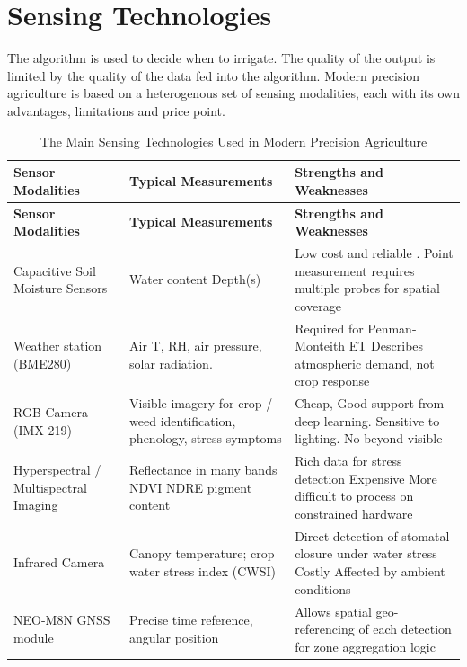 \documentclass[12pt,a4paper]{report}
\renewcommand{\arraystretch}{1.25}
\begin{document}
\section{Sensing Technologies}

The algorithm is used to decide when to irrigate. The quality of the output is limited by the quality of the data fed into the algorithm. Modern precision agriculture is based on a heterogenous set of sensing modalities, each with its own advantages, limitations and price point.

\begingroup
\small
\setlength{\parskip}{0pt}
\setlength{\tabcolsep}{4pt}
\renewcommand{\arraystretch}{1.2}
\begin{longtable}{|P{0.24\textwidth}|P{0.30\textwidth}|P{0.34\textwidth}|}
\caption{The Main Sensing Technologies Used in Modern Precision Agriculture}\\
\hline
\textbf{Sensor Modalities} & \textbf{Typical Measurements} & \textbf{Strengths and Weaknesses} \\ \hline
\endfirsthead
\hline
\textbf{Sensor Modalities} & \textbf{Typical Measurements} & \textbf{Strengths and Weaknesses} \\ \hline
\endhead
Capacitive Soil Moisture Sensors & Water content Depth(s) & Low cost and reliable . Point measurement requires multiple probes for spatial coverage \\ \hline
Weather station (BME280) & Air T, RH, air pressure, solar radiation. & Required for Penman-Monteith ET Describes atmospheric demand, not crop response \\ \hline
RGB Camera (IMX 219) & Visible imagery for crop / weed identification, phenology, stress symptoms & Cheap, Good support from deep learning. Sensitive to lighting. No beyond visible \\ \hline
Hyperspectral / Multispectral Imaging & Reflectance in many bands NDVI NDRE pigment content & Rich data for stress detection Expensive More difficult to process on constrained hardware \\ \hline
Infrared Camera & Canopy temperature; crop water stress index (CWSI) & Direct detection of stomatal closure under water stress Costly Affected by ambient conditions \\ \hline
NEO-M8N GNSS module & \textbullet{} Precise time reference, angular position & Allows spatial geo-referencing of each detection for zone aggregation logic \\ \hline
\end{longtable}
\endgroup
\end{document}
